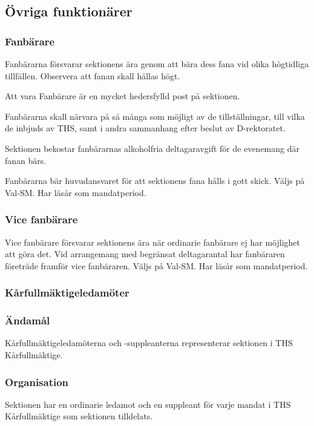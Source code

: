 \documentclass[a4paper,12pt]{article}
\begin{document}
\subsection{Övriga funktionärer}

\subsubsection{Fanbärare}

Fanbärarna försvarar sektionens ära genom att bära dess fana vid olika högtidliga tillfällen. Observera att fanan skall hållas högt.

Att vara Fanbärare är en mycket hedersfylld post på sektionen.

Fanbärarna skall närvara på så många som möjligt av de tillställningar, till vilka de inbjuds av THS, samt i andra sammanhang efter beslut av D-rektoratet.

Sektionen bekostar fanbärarnas alkoholfria deltagaravgift för de evenemang där fanan bärs.

Fanbärarna bär huvudansvaret för att sektionens fana hålls i gott skick. Väljs på Val-SM. Har läsår som mandatperiod.

\subsubsection{Vice fanbärare}

Vice fanbärare försvarar sektionens ära när ordinarie fanbärare ej har möjlighet att göra det. Vid arrangemang med begränsat deltagarantal har fanbäraren företräde framför vice fanbäraren. Väljs på Val-SM. Har läsår som mandatperiod.

\subsubsection{Kårfullmäktigeledamöter}

\subsubsection{Ändamål}

Kårfullmäktigeledamöterna och -suppleanterna representerar sektionen i THS Kårfullmäktige.

\subsubsection{Organisation}

Sektionen har en ordinarie ledamot och en suppleant för varje mandat i THS Kårfullmäktige som sektionen tilldelats.
\end{document}
